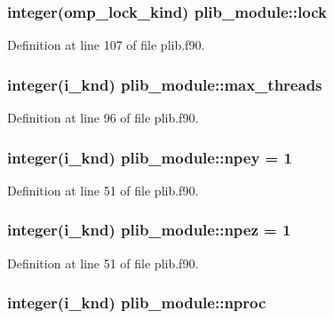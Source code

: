 \hypertarget{classplib__module_a3f4964cd381feb76e21407e3b96915c9}{
\subsubsection[{lock}]{\setlength{\rightskip}{0pt plus 5cm}integer(omp\-\_\-lock\-\_\-kind) plib\-\_\-module\-::lock}}\label{classplib__module_a3f4964cd381feb76e21407e3b96915c9}


Definition at line 107 of file plib.\-f90.

\hypertarget{classplib__module_aac421ecf4251867c4bff7045095d596c}{
\subsubsection[{max\-\_\-threads}]{\setlength{\rightskip}{0pt plus 5cm}integer(i\-\_\-knd) plib\-\_\-module\-::max\-\_\-threads}}\label{classplib__module_aac421ecf4251867c4bff7045095d596c}


Definition at line 96 of file plib.\-f90.

\hypertarget{classplib__module_a90134f6aac88ad1d7341e79cbf8426f1}{
\subsubsection[{npey}]{\setlength{\rightskip}{0pt plus 5cm}integer(i\-\_\-knd) plib\-\_\-module\-::npey = 1}}\label{classplib__module_a90134f6aac88ad1d7341e79cbf8426f1}


Definition at line 51 of file plib.\-f90.

\hypertarget{classplib__module_ab827d3c46ffc494381bb0962d304561a}{
\subsubsection[{npez}]{\setlength{\rightskip}{0pt plus 5cm}integer(i\-\_\-knd) plib\-\_\-module\-::npez = 1}}\label{classplib__module_ab827d3c46ffc494381bb0962d304561a}


Definition at line 51 of file plib.\-f90.

\hypertarget{classplib__module_ae01601bf17ba60fbd8ec154182186409}{
\subsubsection[{nproc}]{\setlength{\rightskip}{0pt plus 5cm}integer(i\-\_\-knd) plib\-\_\-module\-::nproc}}\label{classplib__module_ae01601bf17ba60fbd8ec154182186409}


